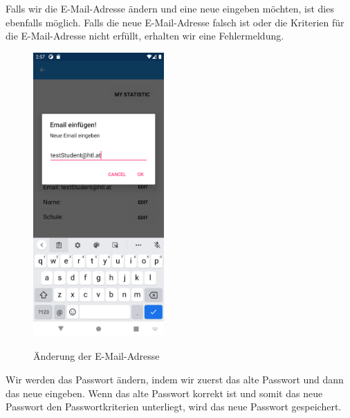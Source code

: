 \newline
Falls wir die E-Mail-Adresse ändern und eine neue eingeben möchten, ist dies ebenfalls möglich. Falls die neue E-Mail-Adresse falsch ist oder die Kriterien für die E-Mail-Adresse nicht erfüllt, erhalten wir eine Fehlermeldung.
\begin{figure}[h]
    \begin{center}
    \includegraphics[width=5cm]{pics/Xamarin Student/26 New Email.png}\
    \caption[MyAccount Änderung der E-Mail-Adresse]{Änderung der E-Mail-Adresse}
    \end{center}
\end{figure}
\newpage
Wir werden das Passwort ändern, indem wir zuerst das alte Passwort und dann das neue eingeben. Wenn das alte Passwort korrekt ist und somit das neue Passwort den Passwortkriterien unterliegt, wird das neue Passwort gespeichert.
